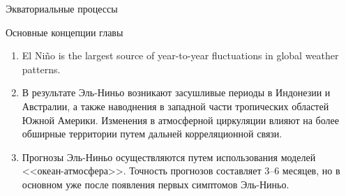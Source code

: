 \begin{chapter}{Экваториальные процессы}
\begin{section}{Основные концепции главы}
\begin{enumerate}
\item
El Ni\~{n}o is the largest source of year-to-year fluctuations in
global weather patterns.
%

\item
В результате Эль-Ниньо возникают засушливые периоды в Индонезии и
Австралии, а также наводнения в западной части тропических областей
Южной Америки. Изменения в атмосферной циркуляции влияют на более
обширные территории путем дальней корреляционной связи.
%

\item
Прогнозы Эль-Ниньо осуществляются путем использования моделей
<<океан-атмосфера>>. Точность прогнозов составляет 3--6 месяцев, но в
основном уже после появления первых симптомов Эль-Ниньо.
%
\end{enumerate}
\end{section}

\end{chapter}